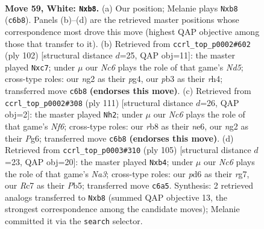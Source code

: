 \documentclass[11pt]{article}
\begin{document}
\clearpage

\begin{figure}[p]\centering
\begin{subfigure}{0.46\textwidth}\centering
\resizebox{\linewidth}{!}{%
\newchessgame
\chessboard[
  setfen={1r6/2R5/2Np1k2/8/6pp/1p6/6n1/6K1 w - - 0 59},
  showmover=false,
  pgfstyle=straightmove, color=movearrow, markmove={c6-b8}
]}
\caption{}
\end{subfigure}\hfill
\begin{subfigure}{0.46\textwidth}\centering
\resizebox{\linewidth}{!}{%
\newchessgame
\chessboard[
  setfen={8/2b2pk1/8/2KN4/6pr/8/R7/8 w - - 0 52},
  showmover=false,
  pgfstyle=straightmove, color=movearrow, markmove={d5-c7}
]}
\caption{}
\end{subfigure}
\\[4pt]
\begin{subfigure}{0.46\textwidth}\centering
\resizebox{\linewidth}{!}{%
\newchessgame
\chessboard[
  setfen={6k1/8/4N1p1/8/5PP1/2r2n2/R4K2/8 b - - 16 56},
  showmover=false,
  pgfstyle=straightmove, color=movearrow, markmove={f3-h2}
]}
\caption{}
\end{subfigure}\hfill
\begin{subfigure}{0.46\textwidth}\centering
\resizebox{\linewidth}{!}{%
\newchessgame
\chessboard[
  setfen={8/6R1/n7/1p3k2/1P1K2N1/8/2P3P1/r7 b - - 2 53},
  showmover=false,
  pgfstyle=straightmove, color=movearrow, markmove={a6-b4}
]}
\caption{}
\end{subfigure}
\caption{\textbf{Move 59, White: \texttt{Nxb8}.} (a) Our position; Melanie plays \texttt{Nxb8} (\texttt{c6b8}). Panels (b)--(d) are the retrieved master positions whose correspondence most drove this move (highest QAP objective among those that transfer to it). (b) Retrieved from \texttt{ccrl\_top\_p0002\#602} (ply 102) [structural distance $d$=25, QAP obj=11]: the master played \texttt{Nxc7}; under $\mu$ our \emph{Nc6} plays the role of that game's \emph{Nd5}; cross-type roles: our \emph{n}g2 as their \emph{p}g4, our \emph{p}b3 as their \emph{r}h4; transferred move \texttt{c6b8} \textbf{(endorses this move)}. (c) Retrieved from \texttt{ccrl\_top\_p0002\#308} (ply 111) [structural distance $d$=26, QAP obj=2]: the master played \texttt{Nh2}; under $\mu$ our \emph{Nc6} plays the role of that game's \emph{Nf6}; cross-type roles: our \emph{r}b8 as their \emph{n}e6, our \emph{n}g2 as their \emph{P}g6; transferred move \texttt{c6b8} \textbf{(endorses this move)}. (d) Retrieved from \texttt{ccrl\_top\_p0003\#310} (ply 105) [structural distance $d$=23, QAP obj=20]: the master played \texttt{Nxb4}; under $\mu$ our \emph{Nc6} plays the role of that game's \emph{Na3}; cross-type roles: our \emph{p}d6 as their \emph{r}g7, our \emph{R}c7 as their \emph{P}b5; transferred move \texttt{c6a5}. Synthesis: 2 retrieved analogs transferred to \texttt{Nxb8} (summed QAP objective 13, the strongest correspondence among the candidate moves); Melanie committed it via the \texttt{search} selector.}
\label{fig:thought-m116}
\end{figure}
\end{document}
